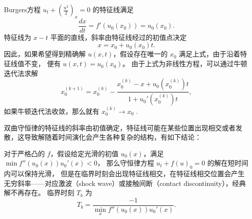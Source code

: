 \begin{example}
    Burgers方程 $u_t + \left(\frac{u^2}2\right)_x = 0$ 的特征线满足
    \[
        \frac{d x}{d t} = f'(u_0(x_0)) = u_0(x_0).
    \]
    特征线为 $x\!-\!t$ 平面的直线，斜率由特征线经过的初值点决定
    \[
        x = x_0 + u_0(x_0) t.
    \]
    因此，如果希望得到精确解 $u(x,t)$，假设存在唯一的 $x_0$ 满足上式，由于沿着特征线值不变，
    便有 $u(x,t) = u_0(x_0)$。
    由于上式为非线性方程，可以通过牛顿迭代法求解
    \[
        x_0^{(k+1)} = x_0^{(k)} - \frac{x_0^{(k)}-x+u_0(x_0^{(k)})t}{1 + u_0'(x_0^{(k)})t},
    \]
    如果牛顿迭代法收敛，那么就有 $x_0^{(k)} \to x_0$ .
\end{example}

双曲守恒律的特征线的斜率由初值确定，特征线可能在某些位置出现相交或者发散，这导致解随着时间演化会产生各种复杂的结构，有如下结论：

\begin{theorem}
    对于严格凸的 $f$，假设给定光滑的初值 $u_0(x)$，满足 $\min f''(u_0(x)) u_0'(x) < 0$，
    那么守恒律方程 $u_t + f(u)_0 = 0$ 的解在短时间内可以保持光滑，
    但是在临界时刻会出现特征线相交，在特征线相交位置会产生无穷斜率——对应激波（shock wave）或接触间断（contact discontinuity），经典解不再存在。
    临界时刻 $T_b$ 为
    \[
        T_b = \frac{-1}{\min_x f''(u_0(x)) u_0'(x)}.
    \]
\end{theorem}

